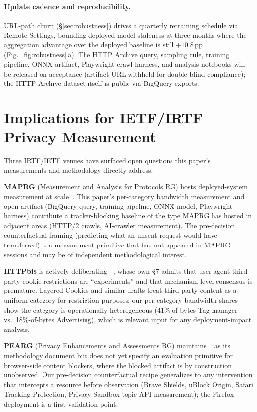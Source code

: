 \documentclass[10pt,sigconf,letterpaper,anonymous]{acmart}
\begin{document}
\paragraph{Update cadence and reproducibility.}
URL-path churn (\S\ref{sec:robustness}) drives a quarterly retraining schedule via Remote Settings, bounding deployed-model staleness at three months where the aggregation advantage over the deployed baseline is still $+10.8$\,pp (Fig.~\ref{fig:robustness}\,a).
The HTTP Archive query, sampling rule, training pipeline, ONNX artifact, Playwright crawl harness, and analysis notebooks will be released on acceptance (artifact URL withheld for double-blind compliance); the HTTP Archive dataset itself is public via BigQuery exports.

\section{Implications for IETF/IRTF Privacy Measurement}
\label{sec:irtf}

Three IRTF/IETF venues have surfaced open questions this paper's measurements and methodology directly address.

\textbf{MAPRG} (Measurement and Analysis for Protocols RG) hosts deployed-system measurement at scale~\cite{maprg-agenda-124}. This paper's per-category bandwidth measurement and open artifact (BigQuery query, training pipeline, ONNX model, Playwright harness) contribute a tracker-blocking baseline of the type MAPRG has hosted in adjacent areas (HTTP/2 crawls, AI-crawler measurement). The pre-decision counterfactual framing (predicting what an unsent request would have transferred) is a measurement primitive that has not appeared in MAPRG sessions and may be of independent methodological interest.

\textbf{HTTPbis} is actively deliberating ~\cite{httpbis-layered-cookies}, whose own \S7 admits that user-agent third-party cookie restrictions are ``experiments'' and that mechanism-level consensus is premature. Layered Cookies and similar drafts treat third-party content as a uniform category for restriction purposes; our per-category bandwidth shares show the category is operationally heterogeneous (41\%-of-bytes Tag-manager vs.\ 18\%-of-bytes Advertising), which is relevant input for any deployment-impact analysis.

\textbf{PEARG} (Privacy Enhancements and Assessments RG) maintains ~\cite{pearg-safe-measurement} as its methodology document but does not yet specify an evaluation primitive for browser-side content blockers, where the blocked artifact is by construction unobserved. Our pre-decision counterfactual recipe generalizes to any intervention that intercepts a resource before observation (Brave Shields, uBlock Origin, Safari Tracking Protection, Privacy Sandbox topic-API measurement); the Firefox deployment is a first validation point.
\end{document}
